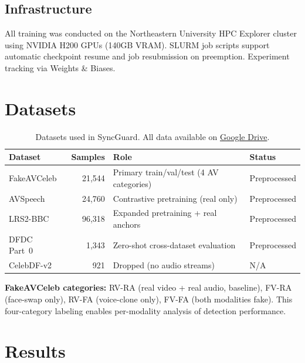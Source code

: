 \documentclass[12pt, letterpaper]{article}
\begin{document}
\subsection{Infrastructure}

All training was conducted on the Northeastern University HPC Explorer cluster using NVIDIA H200 GPUs (140GB VRAM). SLURM job scripts support automatic checkpoint resume and job resubmission on preemption. Experiment tracking via Weights \& Biases.

\section{Datasets}

\renewcommand{\arraystretch}{1.5}
\begin{table}[H]
\centering
\begin{tabularx}{\textwidth}{@{} p{2.8cm} r X p{2.5cm} @{}}
\toprule
\textbf{Dataset} & \textbf{Samples} & \textbf{Role} & \textbf{Status} \\
\midrule
FakeAVCeleb~\cite{khalid2021} & 21,544 & Primary train/val/test (4 AV categories) & Preprocessed \\
AVSpeech & 24,760 & Contrastive pretraining (real only) & Preprocessed \\
LRS2-BBC & 96,318 & Expanded pretraining + real anchors & Preprocessed \\
DFDC Part~0~\cite{dolhansky2020} & 1,343 & Zero-shot cross-dataset evaluation & Preprocessed \\
CelebDF-v2~\cite{li2020} & 921 & Dropped (no audio streams) & N/A \\
\bottomrule
\end{tabularx}
\caption{Datasets used in SyncGuard. All data available on \href{https://drive.google.com/drive/folders/1wQ9cdWo5R9O8ZvwPO7XUnfMvVOgoIF1E}{Google Drive}.}
\end{table}
\renewcommand{\arraystretch}{1.0}

\textbf{FakeAVCeleb categories:} RV-RA (real video + real audio, baseline), FV-RA (face-swap only), RV-FA (voice-clone only), FV-FA (both modalities fake). This four-category labeling enables per-modality analysis of detection performance.

\section{Results}
\end{document}
